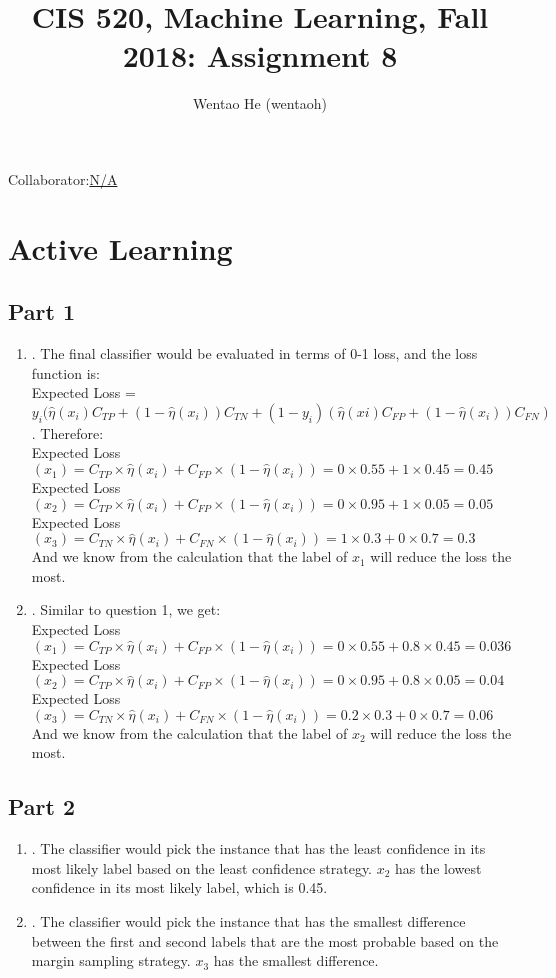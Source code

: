 \documentclass[english]{article}
\title{CIS 520, Machine Learning, Fall 2018: Assignment 8\\}
\date{}
\author{Wentao He (wentaoh)}
\begin{document}
\maketitle
{\normalsize Collaborator:\underline{N/A}}


\section{Active Learning}
\subsection{Part 1}
\begin{enumerate}
    \item {}. The final classifier would be evaluated in terms of 0-1 loss, and the loss function is:\\ Expected Loss = $y_i(\hat{\eta}(x_i)C_{TP} + (1 - \hat{\eta}(x_i))C_{TN} + (1 - y_i)(\hat{\eta}(xi)C_{FP} + (1 - \hat{\eta}(x_i))C_{FN})$. Therefore:\\
    Expected Loss $(x_1) = C_{TP} \times \hat{\eta}(x_i)+C_{FP} \times(1-\hat{\eta}(x_i)) =0\times 0.55+1\times 0.45 = 0.45$\\
    Expected Loss $(x_2) = C_{TP} \times \hat{\eta}(x_i)+C_{FP} \times(1-\hat{\eta}(x_i)) =0\times 0.95+1\times 0.05 = 0.05$\\
    Expected Loss $(x_3) = C_{TN} \times \hat{\eta}(x_i)+C_{FN} \times(1-\hat{\eta}(x_i)) =1\times 0.3+0\times 0.7 = 0.3$\\
    And we know from the calculation that the label of $x_1$ will reduce the loss the most.
    \item {}. Similar to question 1, we get:\\
    Expected Loss $(x_1) = C_{TP} \times \hat{\eta}(x_i)+C_{FP} \times(1-\hat{\eta}(x_i)) =0\times 0.55+0.8\times 0.45 = 0.036$\\
    Expected Loss $(x_2) = C_{TP} \times \hat{\eta}(x_i)+C_{FP} \times(1-\hat{\eta}(x_i)) =0\times 0.95+0.8\times 0.05 = 0.04$\\
    Expected Loss $(x_3) = C_{TN} \times \hat{\eta}(x_i)+C_{FN} \times(1-\hat{\eta}(x_i)) =0.2\times 0.3+0\times 0.7 = 0.06$\\
    And we know from the calculation that the label of $x_2$ will reduce the loss the most.
\end{enumerate}

\subsection{Part 2}
\begin{enumerate}
    \item {}. The classifier would pick the instance that has the least confidence in its most likely label based on the least confidence strategy. $x_2$ has the lowest confidence in its most likely label, which is 0.45.
    \item {}. The classifier would pick the instance that has the smallest difference between the first and second labels that are the most probable based on the margin sampling strategy. $x_3$ has the smallest difference.
\end{enumerate}
\end{document}
